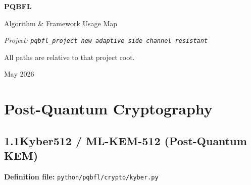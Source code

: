 \documentclass[11pt,a4paper]{article}
\newcommand{\code}[1]{\lstinline[basicstyle=\ttfamily\small]!#1!}
\begin{document}
\begin{titlepage}
  \centering
  \vspace*{3cm}
  {\LARGE\bfseries PQBFL\par}
  \vspace{0.5em}
  {\Large Algorithm \& Framework Usage Map\par}
  \vspace{1.5em}
  {\normalsize\itshape Project: \texttt{pqbfl\_project new adaptive side channel resistant}\par}
  \vspace{0.5em}
  {\normalsize All paths are relative to that project root.\par}
  \vfill
  {\small May 2026\par}
\end{titlepage}

\tableofcontents
\newpage

\section{Post-Quantum Cryptography}

\subsection{1.1\quad Kyber512 / ML-KEM-512 (Post-Quantum KEM)}

\textbf{Definition file:} \code{python/pqbfl/crypto/kyber.py}
\end{document}
